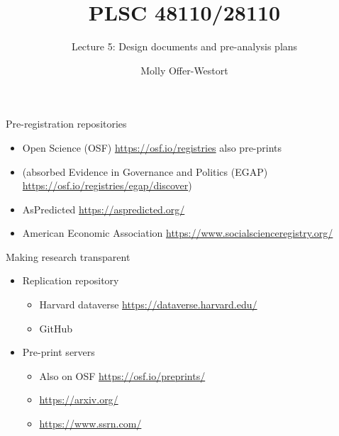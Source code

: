 \documentclass[xcolor={dvipsnames},handout]{beamer}
\title{PLSC 48110/28110}
\subtitle{Lecture 5: Design documents and pre-analysis plans}
\date{}
\author{Molly Offer-Westort}
\institute{Department of Political Science, \\University of Chicago}
\begin{document}
\frame{\titlepage
\thispagestyle{empty}
}
\begin{frame}{Pre-registration repositories}

\begin{itemize}
\item Open Science (OSF) \url{https://osf.io/registries}  also pre-prints
\item (absorbed Evidence in Governance and Politics (EGAP) \url{https://osf.io/registries/egap/discover})
\item AsPredicted \url{https://aspredicted.org/}
\item American Economic Association \url{https://www.socialscienceregistry.org/}
\end{itemize}

\end{frame}



\begin{frame}{Making research transparent}

\begin{itemize}
\item Replication repository
\begin{itemize}
\item Harvard dataverse \url{https://dataverse.harvard.edu/}
\item GitHub
\end{itemize}
\item Pre-print servers
\begin{itemize}
\item Also on OSF \url{https://osf.io/preprints/}
\item \url{https://arxiv.org/}
\item \url{https://www.ssrn.com/}
\end{itemize}
\end{itemize}

\end{frame}


\end{document}
